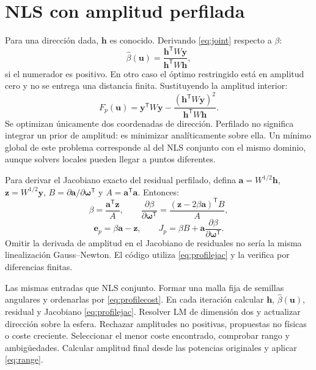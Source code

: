 \documentclass[11pt,a4paper]{article}
\begin{document}
\section{NLS con amplitud perfilada}
Para una dirección dada, $\mathbf h$ es conocido. Derivando \eqref{eq:joint} respecto a $\beta$:
\begin{equation}
 \hat\beta(\mathbf u)=\frac{\mathbf h^{\mathsf T}W\mathbf y}{\mathbf h^{\mathsf T}W\mathbf h},
\end{equation}
si el numerador es positivo. En otro caso el óptimo restringido está en amplitud cero y no se entrega una distancia finita. Sustituyendo la amplitud interior:
\begin{equation}
 F_p(\mathbf u)=\mathbf y^{\mathsf T}W\mathbf y-
 \frac{(\mathbf h^{\mathsf T}W\mathbf y)^2}{\mathbf h^{\mathsf T}W\mathbf h}.
\label{eq:profilecost}
\end{equation}
Se optimizan únicamente dos coordenadas de dirección. Perfilado no significa integrar un prior de amplitud: es minimizar analíticamente sobre ella. Un mínimo global de este problema corresponde al del NLS conjunto con el mismo dominio, aunque solvers locales pueden llegar a puntos diferentes.

Para derivar el Jacobiano exacto del residual perfilado, defina $\mathbf a=W^{1/2}\mathbf h$, $\mathbf z=W^{1/2}\mathbf y$, $B=\partial\mathbf a/\partial\boldsymbol\omega^{\mathsf T}$ y $A=\mathbf a^{\mathsf T}\mathbf a$. Entonces:
\begin{equation}
 \beta=\frac{\mathbf a^{\mathsf T}\mathbf z}{A},\qquad
 \frac{\partial\beta}{\partial\boldsymbol\omega^{\mathsf T}}
 =\frac{(\mathbf z-2\beta\mathbf a)^{\mathsf T}B}{A},
\end{equation}
\begin{equation}
 \mathbf e_p=\beta\mathbf a-\mathbf z,\qquad
 J_p=\beta B+\mathbf a\frac{\partial\beta}{\partial\boldsymbol\omega^{\mathsf T}}.
\label{eq:profilejac}
\end{equation}
Omitir la derivada de amplitud en el Jacobiano de residuales no sería la misma linealización Gauss--Newton. El código utiliza \eqref{eq:profilejac} y la verifica por diferencias finitas.

\begin{algorithm}[htbp]\caption{NLS perfilado}\begin{algorithmic}[1]
\Require Las mismas entradas que NLS conjunto.
\State Formar una malla fija de semillas angulares y ordenarlas por \eqref{eq:profilecost}.
\State En cada iteración calcular $\mathbf h$, $\hat\beta(\mathbf u)$, residual y Jacobiano \eqref{eq:profilejac}.
\State Resolver LM de dimensión dos y actualizar dirección sobre la esfera.
\State Rechazar amplitudes no positivas, propuestas no físicas o coste creciente.
\EndFor
\State Seleccionar el menor coste encontrado, comprobar rango y ambigüedades.
\State Calcular amplitud final desde las potencias originales y aplicar \eqref{eq:range}.
\end{algorithmic}\end{algorithm}
\end{document}
